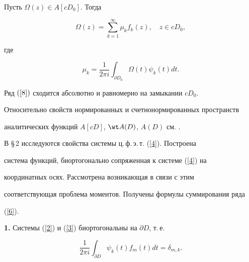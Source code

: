 \pagebreak


 


\begin{thm}


Пусть $\Omega(z)\in A[cD_0]$. Тогда 


\begin{equation}\label{8}


\Omega(z)= \sum_{k=1}^\infty\mu_k f_k(z), \quad z\in cD_0,


\end{equation}


где


\begin{equation}\label{9}


\mu_k=\frac{1}{2\pi i}\int_{\partial D_0}\Omega(t)\psi_k(t) dt.


\end{equation}


Ряд $(\ref{8})$ сходится абсолютно и равномерно на замыкании $cD_0$. 


\end{thm}





Относительно свойств нормированных и счетнонормированных пространств


аналитических функций $A[cD]$, $\wt A(D)$, $A(D)$ см. \cite{Havin}.





В \S\,2 исследуются свойства системы ц.\,ф.\,э.\,т. (\ref{4}). Построена


система функций, биортогонально сопряженная к системе (\ref{4}) на


координатных осях. Рассмотрена возникающая в связи с этим


соответствующая проблема моментов. Получены формулы суммирования ряда


(\ref{6}).


\medskip





{\bf 1.} Системы (\ref{2}) и (\ref{3}) биортогональны на $\partial D$, т.\,е. 


\begin{equation}\label{10}


\frac{1}{2\pi i}\int_{\partial D}\psi_k(t)f_m(t)dt=\delta_{m,k}.


\end{equation}


